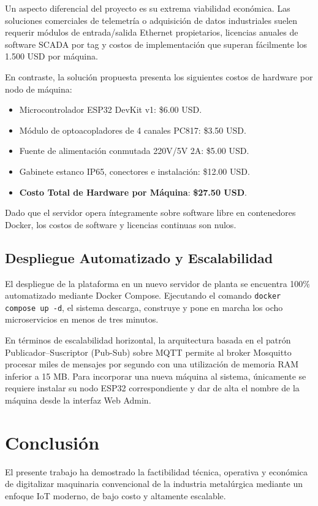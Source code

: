 \documentclass[11pt,a4paper]{article}
\begin{document}
Un aspecto diferencial del proyecto es su extrema viabilidad económica. Las soluciones comerciales de telemetría o adquisición de datos industriales suelen requerir módulos de entrada/salida Ethernet propietarios, licencias anuales de software SCADA por tag y costos de implementación que superan fácilmente los 1.500 USD por máquina.

En contraste, la solución propuesta presenta los siguientes costos de hardware por nodo de máquina:
\begin{itemize}
    \item Microcontrolador ESP32 DevKit v1: \$6.00 USD.
    \item Módulo de optoacopladores de 4 canales PC817: \$3.50 USD.
    \item Fuente de alimentación conmutada 220V/5V 2A: \$5.00 USD.
    \item Gabinete estanco IP65, conectores e instalación: \$12.00 USD.
    \item \textbf{Costo Total de Hardware por Máquina}: \textbf{\$27.50 USD}.
\end{itemize}
Dado que el servidor opera íntegramente sobre software libre en contenedores Docker, los costos de software y licencias continuas son nulos.

\subsection{Despliegue Automatizado y Escalabilidad}

El despliegue de la plataforma en un nuevo servidor de planta se encuentra 100\% automatizado mediante Docker Compose. Ejecutando el comando \texttt{docker compose up -d}, el sistema descarga, construye y pone en marcha los ocho microservicios en menos de tres minutos.

En términos de escalabilidad horizontal, la arquitectura basada en el patrón Publicador--Suscriptor (Pub-Sub) sobre MQTT permite al broker Mosquitto procesar miles de mensajes por segundo con una utilización de memoria RAM inferior a 15 MB. Para incorporar una nueva máquina al sistema, únicamente se requiere instalar su nodo ESP32 correspondiente y dar de alta el nombre de la máquina desde la interfaz Web Admin.

\section{Conclusión}

El presente trabajo ha demostrado la factibilidad técnica, operativa y económica de digitalizar maquinaria convencional de la industria metalúrgica mediante un enfoque IoT moderno, de bajo costo y altamente escalable. 
\end{document}
